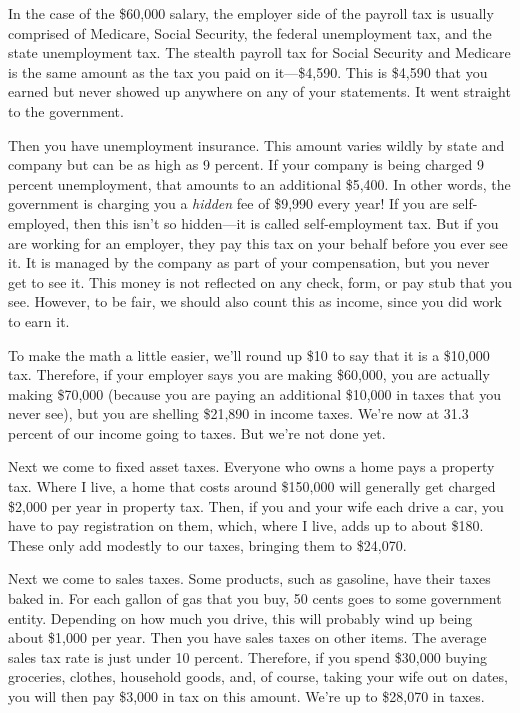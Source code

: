 In the case of the \$60,000 salary, the employer side of the payroll tax
is usually comprised of Medicare, Social Security, the federal
unemployment tax, and the state unemployment tax. The stealth payroll tax for
Social Security and Medicare is the same amount as the tax you paid on
it---\$4,590. This is \$4,590 that you earned but never showed up
anywhere on any of your statements. It went straight to the government.

Then you have unemployment insurance. This amount varies wildly by
state and company but can be as high as 9 percent. If your company is
being charged 9 percent unemployment, that amounts to an additional
\$5,400. In other words, the government is charging you a
\textit{hidden} fee of \$9,990 every year!  If you are self-employed,
then this isn't so hidden---it is called
self-employment tax.  But if you are working for an employer, they pay
this tax on your behalf before you ever see it.  It is managed by the company as part
of your compensation, but you never get to see it.  This 
money is not reflected on any check, form, or pay stub that you
see. However, to be fair, we should also count this as income, since you did work to earn it.

To make the math a little easier, we’ll round up \$10 to say that it is
a \$10,000 tax. Therefore, if your employer says you are making
\$60,000, you are actually making \$70,000 (because you are paying an additional
\$10,000 in taxes that you never see), but you are shelling \$21,890
in income taxes. We’re now at 31.3 percent of our income going to taxes. But
we’re not done yet.

Next we come to fixed asset taxes. Everyone who owns a home pays a
property tax. Where I live, a  home that costs around \$150,000 will generally get
charged \$2,000 per year in property tax. Then, if you and your wife
each drive a car, you have to pay registration on them, which, where I
live, adds up to about \$180. These only add modestly to our taxes,
bringing them to \$24,070.

Next we come to sales taxes. Some products, such as gasoline, have their
taxes baked in. For each gallon of gas that you buy, 50 cents goes to
some government entity. Depending on how much you drive, this will probably 
wind up being about \$1,000 per year. Then you have sales taxes on
other items. The average sales tax rate is just under 10 percent.
Therefore, if you
spend \$30,000 buying groceries, clothes, household goods, and, of
course, taking your wife out on
dates, you will then
pay \$3,000 in tax on this amount.
We’re up to \$28,070
in taxes. 

